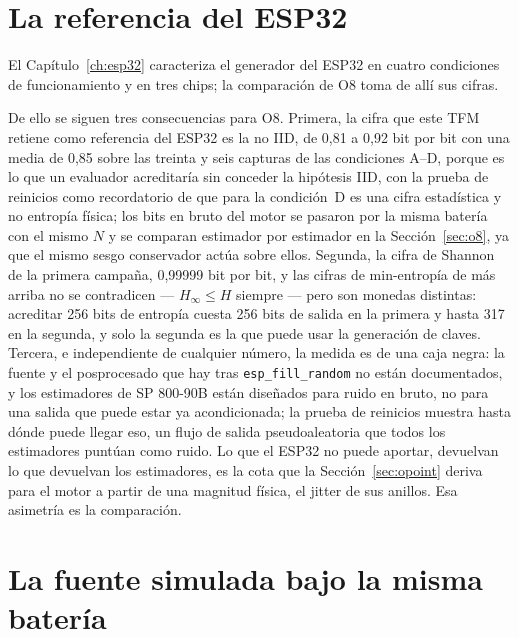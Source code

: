 \section{La referencia del ESP32}
\label{sec:esp32_ref}

El Capítulo~\ref{ch:esp32} caracteriza el generador del ESP32 en cuatro
condiciones de funcionamiento y en tres chips; la comparación de O8 toma
de allí sus cifras.

De ello se siguen tres consecuencias para O8. Primera, la cifra que este
TFM retiene como referencia del ESP32 es la no IID, de 0,81 a 0,92 bit por
bit con una media de 0,85 sobre las treinta y seis capturas de las
condiciones A--D, porque es lo que un evaluador acreditaría sin conceder
la hipótesis IID, con la prueba de reinicios como recordatorio de que para
la condición~D es una cifra estadística y no entropía física; los bits en
bruto del motor se pasaron por la misma batería con el mismo $N$ y se
comparan estimador por estimador en la Sección~\ref{sec:o8}, ya que el
mismo sesgo conservador actúa sobre ellos. Segunda, la cifra de Shannon
de la primera campaña, 0,99999 bit por bit, y las cifras de
min-entropía de más arriba no se contradicen --- $H_\infty \le H$
siempre --- pero son monedas distintas: acreditar 256 bits de entropía
cuesta 256 bits de salida en la primera y hasta 317 en la segunda, y solo
la segunda es la que puede usar la generación de claves. Tercera, e
independiente de cualquier número, la medida es de una caja negra: la
fuente y el posprocesado que hay tras \texttt{esp\_fill\_random} no están
documentados, y los estimadores de SP 800-90B están diseñados para ruido
en bruto, no para una salida que puede estar ya acondicionada; la prueba
de reinicios muestra hasta dónde puede llegar eso, un flujo de salida
pseudoaleatoria que todos los estimadores puntúan como ruido. Lo que el
ESP32 no puede aportar, devuelvan lo que devuelvan los estimadores, es la
cota que la Sección~\ref{sec:opoint} deriva para el motor a partir de una
magnitud física, el jitter de sus anillos. Esa asimetría es la comparación.

\section{La fuente simulada bajo la misma batería}
\label{sec:sim_90b}

